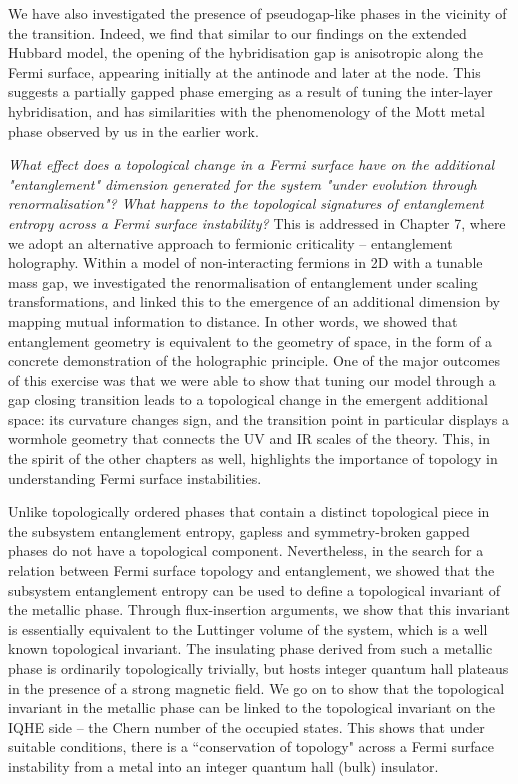 We have also investigated the presence of pseudogap-like phases in the vicinity of the transition. Indeed, we find that similar to our findings on the extended Hubbard model, the opening of the hybridisation gap is anisotropic along the Fermi surface, appearing initially at the antinode and later at the node. This suggests a partially gapped phase emerging as a result of tuning the inter-layer hybridisation, and has similarities with the phenomenology of the Mott metal phase observed by us in the earlier work.

{\it What effect does a topological change in a Fermi surface have on the additional "entanglement" dimension generated for the system "under evolution through renormalisation"? What happens to the topological signatures of entanglement entropy across a Fermi surface instability?} This is addressed in Chapter 7, where we adopt an alternative approach to fermionic criticality -- entanglement holography. Within a model of non-interacting fermions in 2D with a tunable mass gap, we investigated the renormalisation of entanglement under scaling transformations, and linked this to the emergence of an additional dimension by mapping mutual information to distance. In other words, we showed that entanglement geometry is equivalent to the geometry of space, in the form of a concrete demonstration of the holographic principle. One of the major outcomes of this exercise was that we were able to show that tuning our model through a gap closing transition leads to a topological change in the emergent additional space: its curvature changes sign, and the transition point in particular displays a wormhole geometry that connects the UV and IR scales of the theory. This, in the spirit of the other chapters as well, highlights the importance of topology in understanding Fermi surface instabilities.

Unlike topologically ordered phases that contain a distinct topological piece in the subsystem entanglement entropy, gapless and symmetry-broken gapped phases do not have a topological component. Nevertheless, in the search for a relation between Fermi surface topology and entanglement, we showed that the subsystem entanglement entropy can be used to define a topological invariant of the metallic phase. Through flux-insertion arguments, we show that this invariant is essentially equivalent to the Luttinger volume of the system, which is a well known topological invariant. The insulating phase derived from such a metallic phase is ordinarily topologically trivially, but hosts integer quantum hall plateaus in the presence of a strong magnetic field. We go on to show that the topological invariant in the metallic phase can be linked to the topological invariant on the IQHE side -- the Chern number of the occupied states. This shows that under suitable conditions, there is a ``conservation of topology" across a Fermi surface instability from a metal into an integer quantum hall (bulk) insulator.

